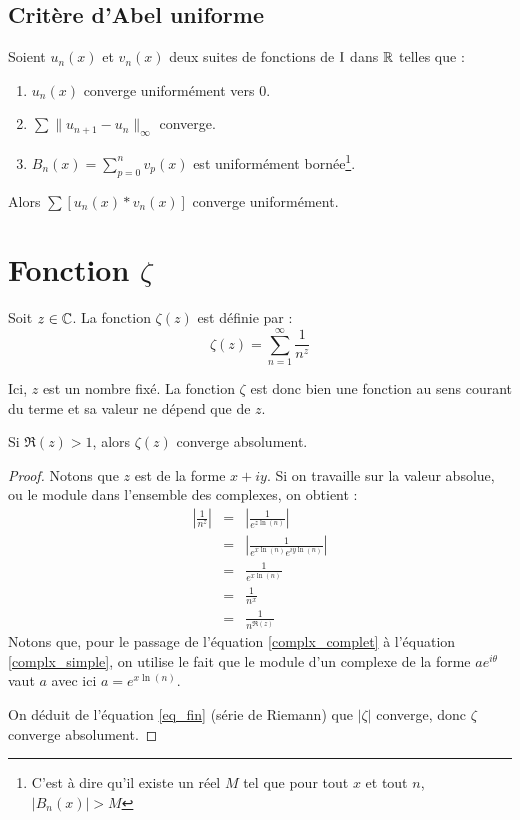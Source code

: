 \subsection{Critère d'Abel uniforme}
\begin{thm}
Soient $u_n(x)$ et $v_n(x)$ deux suites de fonctions de $\text{I}$ dans $\mathbb{R}$ telles que :
\begin{enumerate}
	\item $u_n(x)$ converge uniformément vers 0.
	\item $\sum\|u_{n+1}-u_n\|_\infty$ converge.
	\item $B_n(x)=\sum\limits_{p=0}^nv_p(x)$ est uniformément bornée\footnote{C'est à dire qu'il existe un réel $M$ tel que pour tout $x$ et tout $n$, $|B_n(x)|>M$}.
\end{enumerate}
Alors $\sum\left[u_n(x)*v_n(x)\right]$ converge uniformément.
\end{thm}

\section{Fonction $\zeta$}
\begin{defi}
Soit $z\in\mathbb{C}$. La fonction $\zeta(z)$ est définie par :
$$\zeta(z)=\sum\limits_{n=1}^\infty \frac{1}{n^z}$$
\end{defi}
\begin{note}
Ici, $z$ est un nombre fixé. La fonction $\zeta$ est donc bien une fonction au sens courant du terme et sa valeur ne dépend que de $z$.
\end{note}
\begin{propo}
 Si $\Re(z) > 1$, alors $\zeta(z)$ converge absolument. 
\end{propo}
\begin{proof}
Notons que $z$ est de la forme $x+iy$. Si on travaille sur la valeur absolue, ou le module dans l'ensemble des complexes, on obtient :
\begin{eqnarray}
	\left|\frac{1}{n^z}\right| &=&\left|\frac{1}{e^{z\ln(n)}}\right|\nonumber\\
	&=&\left|\frac{1}{e^{x\ln(n)}e^{iy\ln(n)}}\right|\label{complx_complet}\\
	&=&\frac{1}{e^{x\ln(n)}}\label{complx_simple}\\
	&=&\frac{1}{n^x}\nonumber\\
	&=&\frac{1}{n^{\Re(z)}}\label{eq_fin}
\end{eqnarray}
Notons que, pour le passage de l'équation \eqref{complx_complet} à l'équation \eqref{complx_simple}, on utilise le fait que le module d'un complexe de la forme $ae^{i\theta}$ vaut $a$ avec ici $a=e^{x\ln(n)}$.

On déduit de l'équation \eqref{eq_fin} (série de Riemann) que $|\zeta|$ converge, donc $\zeta$ converge absolument.
\end{proof}
